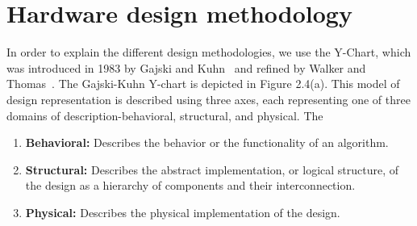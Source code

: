 \section{Hardware design methodology}

In order to explain the different design methodologies, we use the Y-Chart, which was introduced in 1983 by Gajski and Kuhn~\cite{gajski_1992_high} and refined by Walker and Thomas~\cite{walker_1985_y_model}.
The Gajski-Kuhn Y-chart is depicted in Figure 2.4(a). This model of design representation is described using three axes, each representing one of three domains of description-behavioral, structural, and physical. The

\begin{enumerate}
    \item \textbf{Behavioral: } Describes the behavior or the functionality of an algorithm.
    \item \textbf{Structural: } Describes the abstract implementation, or logical structure, of the design as a hierarchy of components and their interconnection.
    \item \textbf{Physical: }  Describes the physical implementation of the design.
\end{enumerate}
